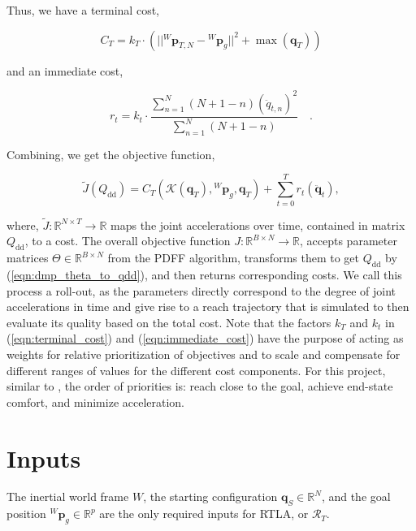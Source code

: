 \documentclass[10pt]{article}
\begin{document}
Thus, we have a terminal cost,

\begin{equation}
\label{eqn:terminal_cost}
	C_T = k_T \cdot \left(||{^W\mathbf{p}_{T, N}} - {^W}\mathbf{p}_{g}||^2 + \max(\mathbf{q}_T)\right)
\end{equation}

and an immediate cost,

\begin{equation}
\label{eqn:immediate_cost}
	r_t  =  k_t \cdot \frac{\sum_{n=1}^N (N+1-n)(\ddot{q}_{t, n})^2}{\sum_{n=1}^N (N+1-n)} \quad .
\end{equation}

Combining, we get the objective function,

\begin{equation}
	\tilde{J}(Q_{\text{dd}}) = C_T\left(\mathcal{K}(\mathbf{q}_T), {^W}\mathbf{p}_{g}, \mathbf{q}_T\right) + \sum_{t=0}^T r_t(\ddot{\mathbf{q}}_t),
\end{equation}

where, $\tilde{J}: \mathbb{R}^{N \times T} \rightarrow \mathbb{R}$ maps the joint accelerations over time, contained in matrix $Q_{\text{dd}}$, to a cost. The overall objective function $J: \mathbb{R}^{B \times N} \rightarrow \mathbb{R}$, accepts parameter matrices $\Theta \in \mathbb{R}^{B \times N}$ from the PDFF algorithm, transforms them to get $Q_{\text{dd}}$ by (\ref{eqn:dmp_theta_to_qdd}), and then returns corresponding costs. We call this process a roll-out, as the parameters directly correspond to the degree of joint accelerations in time and give rise to a reach trajectory that is simulated to then evaluate its quality based on the total cost. Note that the factors $k_T$ and $k_t$ in (\ref{eqn:terminal_cost}) and (\ref{eqn:immediate_cost}) have the purpose of acting as weights for relative prioritization of objectives and to scale and compensate for different ranges of values for the different cost components. For this project, similar to \cite{pdff}, the order of priorities is: reach close to the goal, achieve end-state comfort, and minimize acceleration.

\section{Inputs}
The inertial world frame $W$, the starting configuration $\mathbf{q}_S \in \mathbb{R}^N$, and the goal position ${^W}\mathbf{p}_{g} \in \mathbb{R}^p$ are the only required inputs for RTLA, or $\mathcal{R}_T$.
\end{document}
